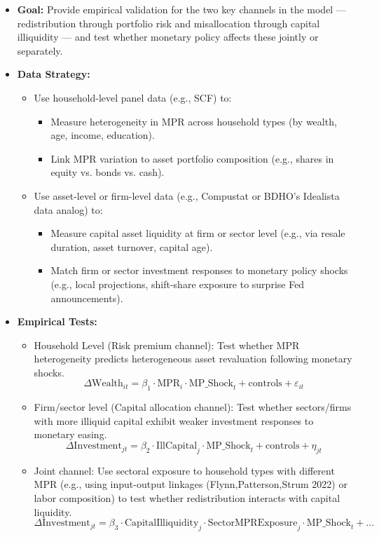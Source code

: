 \documentclass[10pt]{article}
\begin{document}
\begin{itemize}
\begin{itemize}
\item \textbf{Goal:} Provide empirical validation for the two key channels in the model — redistribution through portfolio risk and misallocation through capital illiquidity — and test whether monetary policy affects these jointly or separately.
\item \textbf{Data Strategy:}
\begin{itemize}
    \item Use household-level panel data (e.g., SCF) to:
    \begin{itemize}
        \item Measure heterogeneity in MPR  across household types (by wealth, age, income, education).
        \item Link MPR variation to asset portfolio composition (e.g., shares in equity vs. bonds vs. cash).
    \end{itemize}
    \item Use asset-level or firm-level data (e.g., Compustat or BDHO’s Idealista data analog) to:
    \begin{itemize}
        \item Measure capital asset liquidity at firm or sector level (e.g., via resale duration, asset turnover, capital age).
        \item Match firm or sector investment responses to monetary policy shocks (e.g., local projections, shift-share exposure to surprise Fed announcements).
    \end{itemize}
\end{itemize}

\item \textbf{Empirical Tests:}
\begin{itemize}
    \item Household Level (Risk premium channel): Test whether MPR heterogeneity predicts heterogeneous asset revaluation following monetary shocks.
    \[
    \Delta \text{Wealth}_{it} = \beta_1 \cdot \text{MPR}_i \cdot \text{MP\_Shock}_t + \text{controls} + \varepsilon_{it}
    \]
    \item Firm/sector level (Capital allocation channel): Test whether sectors/firms with more illiquid capital exhibit weaker investment responses to monetary easing.
    \[
    \Delta \text{Investment}_{jt} = \beta_2 \cdot \text{IllCapital}_j \cdot \text{MP\_Shock}_t + \text{controls} + \eta_{jt}
    \]
    \item Joint channel: Use sectoral exposure to household types with different MPR (e.g., using input-output linkages (Flynn,Patterson,Strum 2022) or labor composition) to test whether redistribution interacts with capital liquidity.
    \[
    \Delta \text{Investment}_{jt} = \beta_3 \cdot \text{CapitalIlliquidity}_j \cdot \text{SectorMPRExposure}_j \cdot \text{MP\_Shock}_t + ...
    \]
\end{itemize}


\end{itemize}
\end{itemize}
\end{document}
